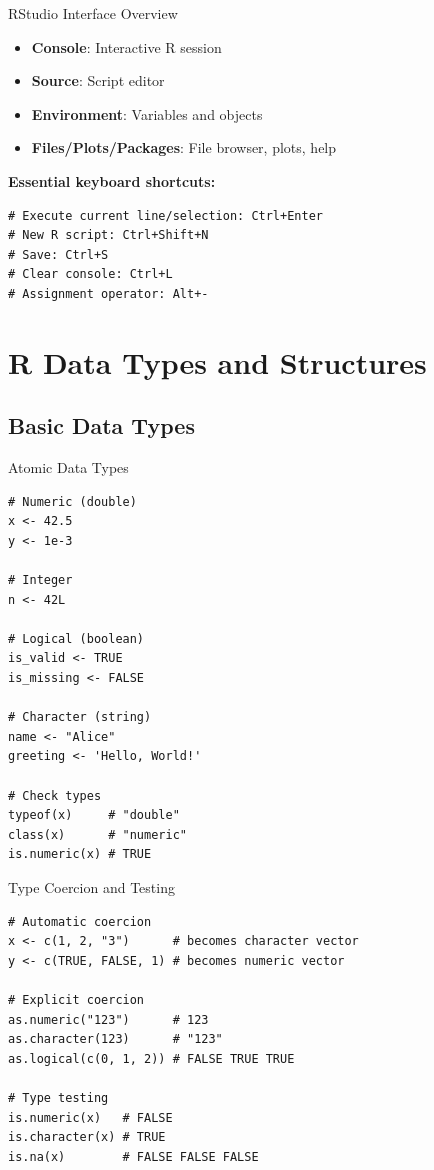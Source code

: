 \documentclass[aspectratio=169]{beamer}
\begin{document}
\begin{frame}[fragile]{RStudio Interface Overview}
  \begin{itemize}
    \item \textbf{Console}: Interactive R session
    \item \textbf{Source}: Script editor
    \item \textbf{Environment}: Variables and objects
    \item \textbf{Files/Plots/Packages}: File browser, plots, help
  \end{itemize}

  \vspace{1em}
  \textbf{Essential keyboard shortcuts:}
\begin{lstlisting}
# Execute current line/selection: Ctrl+Enter
# New R script: Ctrl+Shift+N
# Save: Ctrl+S
# Clear console: Ctrl+L
# Assignment operator: Alt+-
\end{lstlisting}
\end{frame}

\section{R Data Types and Structures}

\subsection{Basic Data Types}

\begin{frame}[fragile]{Atomic Data Types}
\begin{lstlisting}
# Numeric (double)
x <- 42.5
y <- 1e-3

# Integer
n <- 42L

# Logical (boolean)
is_valid <- TRUE
is_missing <- FALSE

# Character (string)
name <- "Alice"
greeting <- 'Hello, World!'

# Check types
typeof(x)     # "double"
class(x)      # "numeric"
is.numeric(x) # TRUE
\end{lstlisting}
\end{frame}

\begin{frame}[fragile]{Type Coercion and Testing}
\begin{lstlisting}
# Automatic coercion
x <- c(1, 2, "3")      # becomes character vector
y <- c(TRUE, FALSE, 1) # becomes numeric vector

# Explicit coercion
as.numeric("123")      # 123
as.character(123)      # "123"
as.logical(c(0, 1, 2)) # FALSE TRUE TRUE

# Type testing
is.numeric(x)   # FALSE
is.character(x) # TRUE
is.na(x)        # FALSE FALSE FALSE
\end{lstlisting}
\end{frame}
\end{document}
